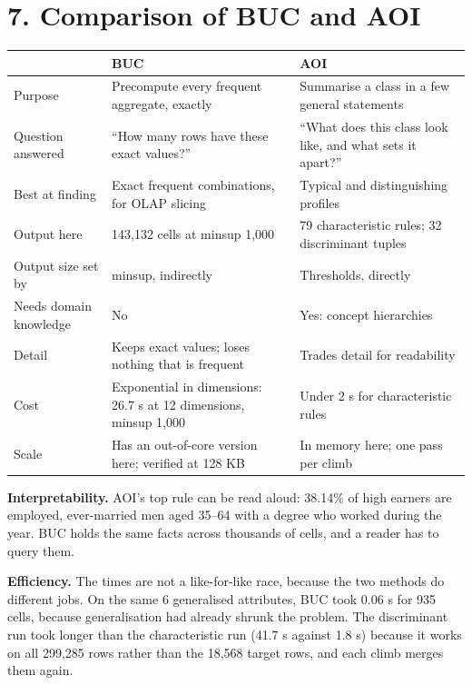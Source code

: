 \documentclass[10pt]{article}
\begin{document}
\section*{7. Comparison of BUC and AOI}
\begin{center}\small
\begin{tabular}{p{}p{}p{}}
\toprule
 & \textbf{BUC} & \textbf{AOI} \\
\midrule
Purpose & Precompute every frequent aggregate, exactly & Summarise a class in a few general statements \\
Question answered & ``How many rows have these exact values?'' & ``What does this class look like, and what sets it apart?'' \\
Best at finding & Exact frequent combinations, for OLAP slicing & Typical and distinguishing profiles \\
Output here & 143,132 cells at minsup 1,000 & 79 characteristic rules; 32 discriminant tuples \\
Output size set by & minsup, indirectly & Thresholds, directly \\
Needs domain knowledge & No & Yes: concept hierarchies \\
Detail & Keeps exact values; loses nothing that is frequent & Trades detail for readability \\
Cost & Exponential in dimensions: 26.7 s at 12 dimensions, minsup 1,000 & Under 2 s for characteristic rules \\
Scale & Has an out-of-core version here; verified at 128 KB & In memory here; one pass per climb \\
\bottomrule
\end{tabular}
\end{center}

\textbf{Interpretability.} AOI's top rule can be read aloud: 38.14\% of high earners are employed, ever-married men aged 35--64 with a degree who worked during the year. BUC holds the same facts across thousands of cells, and a reader has to query them.

\textbf{Efficiency.} The times are not a like-for-like race, because the two methods do different jobs. On the same 6 generalised attributes, BUC took 0.06 s for 935 cells, because generalisation had already shrunk the problem. The discriminant run took longer than the characteristic run (41.7 s against 1.8 s) because it works on all 299,285 rows rather than the 18,568 target rows, and each climb merges them again.
\end{document}
